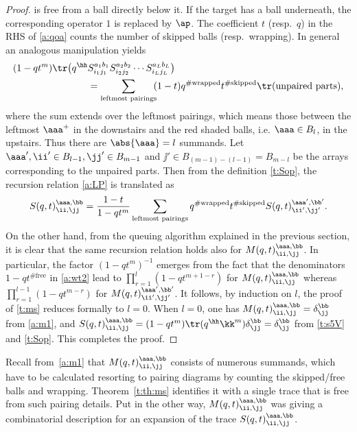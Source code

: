 \begin{proof}
is free from a ball directly below it. If the target has a ball underneath, 
the corresponding operator $1$ is replaced by $\ap$.
The coefficient $t$ (resp.\ $q$) in the RHS of \eqref{a:qoa} counts the number of skipped balls
(resp.\ wrapping). 
%
In general an analogous manipulation yields
\begin{equation}
\label{a:LP}
\begin{aligned}
(1-qt^m)\tr \bigl(q^\hh & S_{i_1j_1}^{a_1b_1} S_{i_2j_2}^{a_2b_2} \cdots S_{i_Lj_L}^{a_Lb_L} \bigr)
\\ & = \sum_{\text{leftmost pairings}}\!\!
(1-t) q^{\#\text{wrapped}}t^{\#\text{skipped}}
\tr(\text{unpaired parts}),
\end{aligned}
\end{equation}
where the sum extends over the leftmost pairings, which means those between the leftmost $\aaa^+$ in the downstairs and 
the red shaded balls, i.e. $\aaa \in B_l$, in the upstairs. Thus there are $\abs{\aaa} = l$ summands.
Let $\aaa', \ii'  \in B_{l-1},  \jj'  \in B_{m-1}$ and $\jj' \in B_{(m-1)-(l-1)}=B_{m-l}$ 
be the arrays corresponding to the unpaired parts.
Then from the definition \eqref{t:Sop},   the  recursion relation \eqref{a:LP}
is translated as
\begin{align}
S(q,t)^{\aaa, \bb}_{\ii,\jj} 
= \frac{1-t}{1-qt^m}\sum_{\text{leftmost pairings}}
q^{\#\text{wrapped}}t^{\#\text{skipped}}
S(q,t)^{\aaa', \bb'}_{\ii',\jj'}.
\end{align}
%
On the other hand,  from the queuing algorithm explained in the previous section,
it is clear that the same recursion relation holds also for $M(q,t)^{\aaa, \bb}_{\ii,\jj}$.
In particular, the factor $(1-qt^m)^{-1}$ emerges from the fact that 
the denominators $1-qt^{\#\text{free}}$ in \eqref{a:wt2} lead to 
$\prod_{r=1}^l(1-qt^{m+1-r})$ for $M(q,t)^{\aaa, \bb}_{\ii,\jj}$ 
whereas $\prod_{r=1}^{l-1}(1-qt^{m-r})$ for $M(q,t)^{\aaa', \bb'}_{\ii',\jj'}$.
It follows, by induction on $l$, the proof of \eqref{t:ms} reduces formally to $l=0$.
When $l=0$, one has $M(q,t)^{\aaa, \bb}_{\ii,\jj}=\delta^\bb_\jj$ from \eqref{a:m1}, 
and $S(q,t)^{\aaa, \bb}_{\ii,\jj} = (1-qt^m)\tr(q^\hh \kk^m)\delta^\bb_\jj=\delta^\bb_\jj$ from
\eqref{t:s5V} and \eqref{t:Sop}.
This completes the proof.
\end{proof}

Recall from~\eqref{a:m1} that $M(q,t)^{\aaa, \bb}_{\ii,\jj}$ consists of 
numerous summands, 
which have to be calculated resorting to pairing diagrams by counting the skipped/free balls and wrapping.
Theorem~\ref{t:th:ms} identifies it with a single trace that is free from such pairing details.
Put in the other way, $M(q,t)^{\aaa, \bb}_{\ii,\jj}$ was giving a combinatorial description for an expansion 
of the trace $S(q,t)^{\aaa, \bb}_{\ii,\jj}$. 

